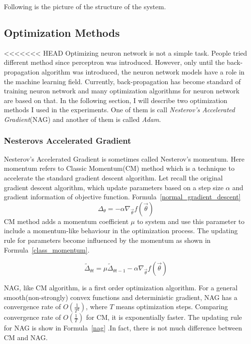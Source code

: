 \documentclass[officiallayout]{tktla}
\begin{document}
Following is the picture of the structure of the system. 

\subsection{Optimization Methods}
<<<<<<< HEAD
Optimizing neuron network is not a simple task. People tried different method since perceptron was introduced. However, only until the back-propagation algorithm was introduced, the neuron network models have a role in the machine learning field. Currently, back-propagation has become standard of training neuron network and many optimization algorithms for neuron network are based on that. In the following section, I will describe two optimization methods I used in the experiments. One of them is call \textit{Nesterov's Accelerated Gradient}(NAG) and another of them is called \textit{Adam}. 
\subsubsection{Nesterovs Accelerated Gradient}
Nesterov's Accelerated Gradient is sometimes called Nesterov's momentum. Here momentum refers to Classic Momentum(CM) method which is a technique to accelerate the standard gradient descent algorithm. Let recall the original gradient descent algorithm, which update parameters based on a step size $\alpha$ and gradient information of objective function. Formula~\ref{normal_gradient_descent}
\begin{equation}
\Delta_\theta = -\alpha \nabla_{\vec{\theta}} f(\vec{\theta})
\label{normal_gradient_descent}
\end{equation}
CM method adds a momentum coefficient $\mu$ to system and use this parameter to include a momentum-like behaviour in the optimization process. The updating rule for parameters become influenced by the momentum as shown in Formula~\ref{class_momentum}.

\begin{equation}
\widetilde{\Delta}_{\theta t} =  \mu \widetilde{\Delta}_{\theta {t-1}}  -\alpha \nabla_{\vec{\theta}} f(\vec{\theta})
\label{class_momentum}
\end{equation}

NAG, like CM algorithm, is a first order optimization algorithm. For a general smooth(non-strongly) convex functions and deterministic gradient, NAG has a convergence rate of $O(\frac{1}{T^2})$, where $T$ means optimization steps. Comparing convergence rate of $O(\frac{1}{T})$ for CM, it is exponentially faster. The updating rule for NAG is show in Formula~\ref{nag} .In fact, there is not much difference between CM and NAG. 
\end{document}

